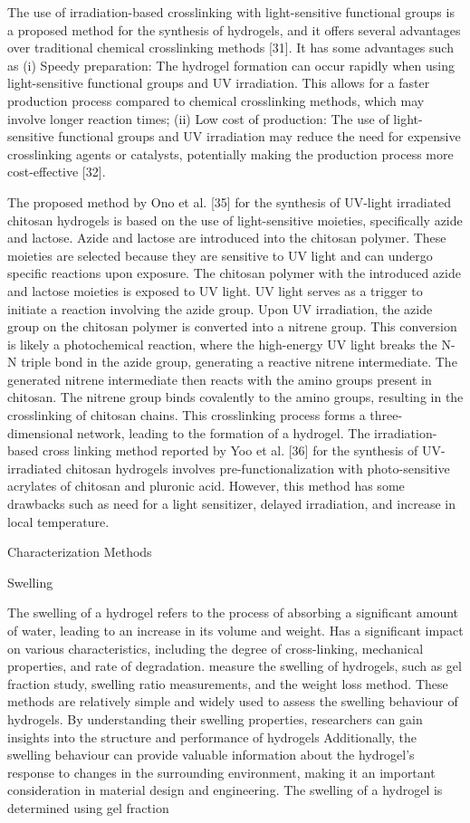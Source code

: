 \documentclass[../../main-notes.tex]{subfiles}
\begin{document}
The use of irradiation-based crosslinking with light-sensitive functional groups is a proposed method for the synthesis of hydrogels, and it offers several advantages over traditional chemical crosslinking methods [31]. 
It has some advantages such as 
    (i) Speedy preparation: The hydrogel formation can occur rapidly when using light-sensitive functional groups and UV irradiation. This allows for a faster production process compared to chemical crosslinking methods, which may involve longer reaction times; 
    (ii) Low cost of production: The use of light-sensitive functional groups and UV irradiation may reduce the need for expensive crosslinking agents or catalysts, potentially making the production process more cost-effective [32]. 

The proposed method by Ono et al. [35] for the synthesis of UV-light irradiated chitosan hydrogels is based on the use of light-sensitive moieties, specifically azide and lactose. 
Azide and lactose are introduced into the chitosan polymer. 
These moieties are selected because they are sensitive to UV light and can undergo specific reactions upon exposure. 
The chitosan polymer with the introduced azide and lactose moieties is exposed to UV light. 
UV light serves as a trigger to initiate a reaction involving the azide group. 
Upon UV irradiation, the azide group on the chitosan polymer is converted into a nitrene group. 
This conversion is likely a photochemical reaction, where the high-energy UV light breaks the N-N triple bond in the azide group, generating a reactive nitrene intermediate. 
The generated nitrene intermediate then reacts with the amino groups present in chitosan. 
The nitrene group binds covalently to the amino groups, resulting in the crosslinking of chitosan chains. 
This crosslinking process forms a three-dimensional network, leading to the formation of a hydrogel. 
The irradiation-based cross linking method reported by Yoo et al. [36] for the synthesis of UV-irradiated chitosan hydrogels involves pre-functionalization with photo-sensitive acrylates of chitosan and pluronic acid. 
However, this method has some drawbacks such as need for a light sensitizer, delayed irradiation, and increase in local temperature.


Characterization Methods

Swelling

The swelling of a hydrogel refers to the process of absorbing a significant amount of water, leading to an increase in its volume and weight. 
Has a significant impact on various characteristics, including the degree of cross-linking, mechanical properties, and rate of degradation.
measure the swelling of hydrogels, such as gel fraction study, swelling ratio measurements, and the weight loss method. 
These methods are relatively simple and widely used to assess the swelling behaviour of hydrogels.
By understanding their swelling properties, researchers can gain insights into the structure and performance of hydrogels
Additionally, the swelling behaviour can provide valuable information about the hydrogel’s response to changes in the surrounding environment, making it an important consideration in material design and engineering. The swelling of a hydrogel is determined using gel fraction
\end{document}
